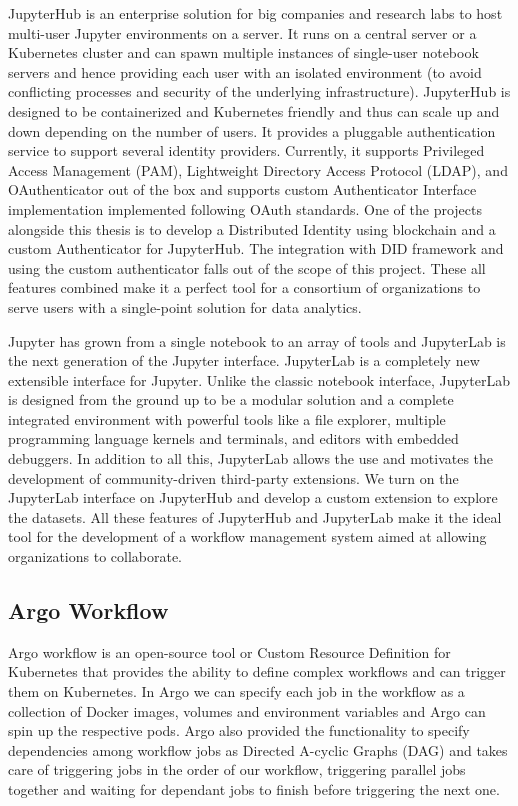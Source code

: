 \bigskip
JupyterHub is an enterprise solution for big companies and research labs to host multi-user Jupyter environments on a server. It runs on a central server or a Kubernetes cluster and can spawn multiple instances of single-user notebook servers and hence providing each user with an isolated environment (to avoid conflicting processes and security of the underlying infrastructure). JupyterHub is designed to be containerized and Kubernetes friendly and thus can scale up and down depending on the number of users. It provides a pluggable authentication service to support several identity providers. Currently, it supports Privileged Access Management (PAM), Lightweight Directory Access Protocol (LDAP), and OAuthenticator out of the box and supports custom Authenticator Interface implementation implemented following OAuth standards. One of the projects alongside this thesis is to develop a Distributed Identity using blockchain and a custom Authenticator for JupyterHub. The integration with DID framework and using the custom authenticator falls out of the scope of this project. These all features combined make it a perfect tool for a consortium of organizations to serve users with a single-point solution for data analytics. 

\bigskip
Jupyter has grown from a single notebook to an array of tools and JupyterLab is the next generation of the Jupyter interface. JupyterLab is a completely new extensible interface for Jupyter. Unlike the classic notebook interface, JupyterLab is designed from the ground up to be a modular solution and a complete integrated environment with powerful tools like a file explorer, multiple programming language kernels and terminals, and editors with embedded debuggers. In addition to all this, JupyterLab allows the use and motivates the development of community-driven third-party extensions. We turn on the JupyterLab interface on JupyterHub and develop a custom extension to explore the datasets. All these features of JupyterHub and JupyterLab make it the ideal tool for the development of a workflow management system aimed at allowing organizations to collaborate.

\subsection{Argo Workflow}
Argo workflow is an open-source tool or Custom Resource Definition for Kubernetes that provides the ability to define complex workflows and can trigger them on Kubernetes. In Argo we can specify each job in the workflow as a collection of Docker images, volumes and environment variables and Argo can spin up the respective pods. Argo also provided the functionality to specify dependencies among workflow jobs as Directed A-cyclic Graphs (DAG) and takes care of triggering jobs in the order of our workflow, triggering parallel jobs together and waiting for dependant jobs to finish before triggering the next one.

